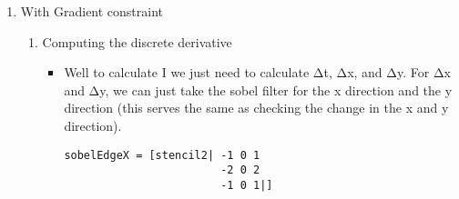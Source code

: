 \documentclass{article}
\begin{document}
\begin{enumerate}
\begin{itemize}
\begin{itemize}
\begin{itemize}
\end{itemize}
\item With all these functions defined now f is defined and the entire
function just works! and if one is still confused, try re-reading
from top to bottom again, now that you know what each little
function/constant means
\end{itemize}
\item I did a few test cases for this, so I'll include 1 of them
\begin{verbatim}
computeUnboxedS (convfn 3 1 (fromListUnboxed (Z :. (10 :: Int) :. (10 :: Int)) [0..99])
                            (fromListUnboxed (Z :. (10 :: Int) :. (10 :: Int)) [0..99]))
\end{verbatim}
\begin{itemize}
\item and thankfully it gave me back the correct size of the output
\begin{itemize}
\item AUnboxed ((Z :. 2) :. 2) [0.0,0.0,0.0,0.0]
\end{itemize}
\end{itemize}
\item The only thing left to define is the meanDiff I used in convfn
\begin{verbatim}
meanDiff :: (Source r c, Source r2 c, Floating c) ⇒ Array r DIM2 c → Array r2 DIM2 c → c
meanDiff as = √ ∘ (/ fromIntegral (i * j)) ∘ sumAllS ∘ R.zipWith (\x y → abs (x^2 - y^2)) as
  where Z :. i :. j = R.extent as
\end{verbatim}
\begin{itemize}
\item meanDiff just takes 2 arrays and basically just runs the formula
RMSE(a,b) = $\sqrt{\frac{\sum_{t=0}^{n-1}((a_t - b_t)^{2})}{n}}$
\end{itemize}
\end{itemize}
\item With Gradient constraint
\label{sec-1-2}
\begin{enumerate}
\item Computing the discrete derivative
\label{sec-1-2-1}
\begin{itemize}
\item Well to calculate I we just need to calculate Δt, Δx, and Δy. For Δx and
Δy, we can just take the sobel filter for the x direction and the y
direction (this serves the same as checking the change in the x and y
direction).
\begin{verbatim}
sobelEdgeX = [stencil2| -1 0 1
                        -2 0 2
                        -1 0 1|]



\end{verbatim}
\end{itemize}
\end{enumerate}
\end{enumerate}
\end{document}
